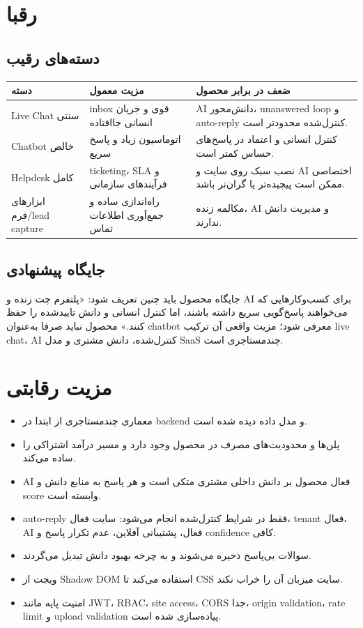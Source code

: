 \documentclass[12pt,a4paper]{article}
\begin{document}
\section{رقبا}
\subsection{دسته‌های رقیب}
\begin{longtable}{R{42mm} R{52mm} R{54mm}}
\toprule
\textbf{دسته} & \textbf{مزیت معمول} & \textbf{ضعف در برابر محصول} \\
\midrule
\endhead
Live Chat سنتی & inbox قوی و جریان انسانی جاافتاده & AI دانش‌محور، unanswered loop و auto-reply کنترل‌شده محدودتر است. \\
Chatbot خالص & اتوماسیون زیاد و پاسخ سریع & کنترل انسانی و اعتماد در پاسخ‌های حساس کمتر است. \\
Helpdesk کامل & ticketing، SLA و فرآیندهای سازمانی & نصب سبک روی سایت و AI اختصاصی ممکن است پیچیده‌تر یا گران‌تر باشد. \\
ابزارهای فرم/lead capture & راه‌اندازی ساده و جمع‌آوری اطلاعات تماس & مکالمه زنده، AI و مدیریت دانش ندارند. \\
\bottomrule
\end{longtable}

\subsection{جایگاه پیشنهادی}
جایگاه محصول باید چنین تعریف شود: «پلتفرم چت زنده و AI برای کسب‌وکارهایی که می‌خواهند پاسخ‌گویی سریع داشته باشند، اما کنترل انسانی و دانش تاییدشده را حفظ کنند.» محصول نباید صرفا به‌عنوان chatbot معرفی شود؛ مزیت واقعی آن ترکیب live chat، AI کنترل‌شده، دانش مشتری و مدل SaaS چندمستاجری است.

\section{مزیت رقابتی}
\begin{itemize}
  \item معماری چندمستاجری از ابتدا در backend و مدل داده دیده شده است.
  \item پلن‌ها و محدودیت‌های مصرف در محصول وجود دارد و مسیر درآمد اشتراکی را ساده می‌کند.
  \item AI فعال محصول بر دانش داخلی مشتری متکی است و هر پاسخ به منابع دانش و score وابسته است.
  \item auto-reply فقط در شرایط کنترل‌شده انجام می‌شود: سایت فعال، tenant فعال، AI فعال، پشتیبانی آفلاین، عدم تکرار پاسخ و confidence کافی.
  \item سوالات بی‌پاسخ ذخیره می‌شوند و به چرخه بهبود دانش تبدیل می‌گردند.
  \item ویجت از Shadow DOM استفاده می‌کند تا CSS سایت میزبان آن را خراب نکند.
  \item امنیت پایه مانند JWT، RBAC، site access، CORS جدا، origin validation، rate limit و upload validation پیاده‌سازی شده است.
\end{itemize}
\end{document}
